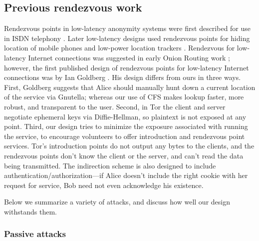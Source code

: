 \documentclass[times,10pt,twocolumn]{article}
\begin{document}
\subsection{Previous rendezvous work}

Rendezvous points in low-latency anonymity systems were first
described for use in ISDN telephony \cite{isdn-mixes,jerichow-jsac98}.
Later low-latency designs used rendezvous points for hiding location
of mobile phones and low-power location trackers
\cite{federrath-ih96,reed-protocols97}.  Rendezvous for low-latency
Internet connections was suggested in early Onion Routing work
\cite{or-ih96}; however, the first published design of rendezvous
points for low-latency Internet connections was by Ian Goldberg
\cite{ian-thesis}. His design differs from
ours in three ways. First, Goldberg suggests that Alice should manually
hunt down a current location of the service via Gnutella; whereas our
use of CFS makes lookup faster, more robust, and transparent to the
user. Second, in Tor the client and server negotiate ephemeral keys
via Diffie-Hellman, so plaintext is not exposed at any point. Third,
our design tries to minimize the exposure associated with running the
service, to encourage volunteers to offer introduction and rendezvous
point services. Tor's introduction points do not output any bytes to the
clients, and the rendezvous points don't know the client or the server,
and can't read the data being transmitted. The indirection scheme is
also designed to include authentication/authorization---if Alice doesn't
include the right cookie with her request for service, Bob need not even
acknowledge his existence.

\label{sec:attacks}


  
Below we summarize a variety of attacks, and discuss how well our
design withstands them.

\subsubsection*{Passive attacks}
\end{document}
